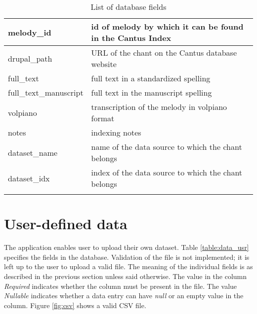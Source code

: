 \begin{longtable}{| p{} | p{} |}
 melody\_id     & id of melody by which it can be found in the Cantus Index \\ \hline
 drupal\_path   & URL of the chant on the Cantus database website \\ \hline
 full\_text     & full text in a standardized spelling \\ \hline
 full\_text\_manuscript & full text in the manuscript spelling \\ \hline
 volpiano       & transcription of the melody in volpiano format \\ \hline
 notes          & indexing notes \\ \hline
 dataset\_name  & name of the data source to which the chant belongs \\ \hline
 dataset\_idx   & index of the data source to which the chant belongs \\
 \hline

\caption{List of database fields}
\label{table:data_db}
\end{longtable}

\section{User-defined data}
\label{section:data_usr}

The application enables user to upload their own dataset. Table \ref{table:data_usr} specifies the fields in the database. Validation of the
file is not implemented; it is left up to the user to upload a valid file. The meaning of the individual
fields is as described in the previous section unless said otherwise. The value in the column \emph{Required} indicates whether
the column must be present in the file. The value \emph{Nullable} indicates whether a data entry can have \emph{null} or an empty value in the column.
Figure \ref{fig:csv} shows a valid CSV file.

